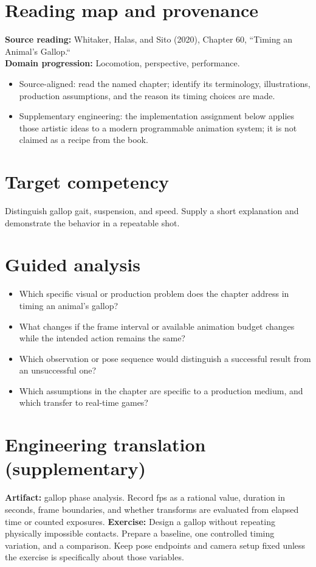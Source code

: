 \documentclass[10pt,letterpaper]{article}
\begin{document}
\makedoctitle
\makedocsummary

\section{Reading map and provenance}
\textbf{Source reading:} Whitaker, Halas, and Sito (2020), Chapter 60, ``Timing an Animal’s Gallop.``\\
\textbf{Domain progression:} Locomotion, perspective, performance.
\begin{itemize}
\item Source-aligned: read the named chapter; identify its terminology, illustrations, production assumptions, and the reason its timing choices are made.
\item Supplementary engineering: the implementation assignment below applies those artistic ideas to a modern programmable animation system; it is not claimed as a recipe from the book.
\end{itemize}
\section{Target competency}
Distinguish gallop gait, suspension, and speed. Supply a short explanation and demonstrate the behavior in a repeatable shot.
\section{Guided analysis}
\begin{itemize}
\item Which specific visual or production problem does the chapter address in timing an animal’s gallop?
\item What changes if the frame interval or available animation budget changes while the intended action remains the same?
\item Which observation or pose sequence would distinguish a successful result from an unsuccessful one?
\item Which assumptions in the chapter are specific to a production medium, and which transfer to real-time games?
\end{itemize}
\section{Engineering translation (supplementary)}
\textbf{Artifact:} gallop phase analysis. Record fps as a rational value, duration in seconds, frame boundaries, and whether transforms are evaluated from elapsed time or counted exposures.
\textbf{Exercise:} Design a gallop without repeating physically impossible contacts. Prepare a baseline, one controlled timing variation, and a comparison. Keep pose endpoints and camera setup fixed unless the exercise is specifically about those variables.
\end{document}
